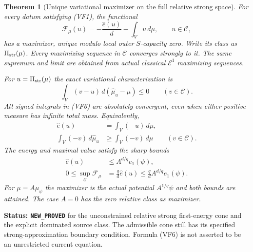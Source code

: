 \documentclass[11pt,a4paper]{article}
\numberwithin{equation}{section}
\newtheorem{theorem}{Theorem}[section]
\theoremstyle{definition}
\theoremstyle{remark}
\begin{document}
\begin{theorem}[Unique variational maximizer on the full relative strong space]
\label{thm:r11-full-strong-dominated-maximizer}
For every datum satisfying (VF1), the functional
\[
 \mathcal F_\mu(u)
      =-\frac{\widehat e(u)}{d}-\int_Vu\,d\mu,
                       \qquad u\in\mathscr C,
 \tag{VF5}
\]
has a maximizer, unique modulo local outer $S$-capacity zero.
Write its class as $\Pi_{\rm str}(\mu)$.  Every maximizing
sequence in $\mathscr C$ converges strongly to it.  The same
supremum and limit are obtained from actual classical
$\mathcal E^1$ maximizing sequences.

For $u=\Pi_{\rm str}(\mu)$ the exact variational characterization is
\[
 \int_V(v-u)\,d(\widehat\mu_u-\mu)\leq0
                                      \qquad(v\in\mathscr C).
 \tag{VF6}
\]
All signed integrals in (VF6) are absolutely convergent, even
when either positive measure has infinite total mass.  Equivalently,
\[
 \begin{split}
  \widehat e(u)&=\int_V(-u)\,d\mu,\\
  \int_V(-v)\,d\widehat\mu_u
                  &\geq\int_V(-v)\,d\mu\qquad(v\in\mathscr C).
 \end{split}
 \tag{VF7}
\]
The energy and maximal value satisfy the sharp bounds
\[
 \begin{split}
  \widehat e(u)&\leq A^{d/q}e_1(\psi),\\
  0\leq\sup_{\mathscr C}\mathcal F_\mu
       &=\frac qd\widehat e(u)
                          \leq\frac qd A^{d/q}e_1(\psi).
 \end{split}
 \tag{VF8}
\]
For $\mu=A\mu_\psi$ the maximizer is the actual potential
$A^{1/q}\psi$ and both bounds are attained.  The case $A=0$
has the zero relative class as maximizer.
\end{theorem}

\noindent\textbf{Status: \texttt{NEW\_PROVED}} for the
unconstrained relative strong first-energy cone and the explicit
dominated source class.  The admissible cone still has its
specified strong-approximation boundary condition.  Formula
(VF6) is not asserted to be an unrestricted current equation.
\end{document}
